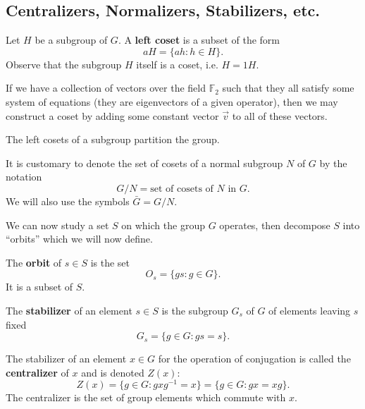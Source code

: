 \subsection{Centralizers, Normalizers, Stabilizers, etc.}

\begin{defn}
Let $H$ be a subgroup of $G$. A \textbf{left coset} is a subset of the form
\begin{equation}
aH = \{ ah : h\in H \}.
\end{equation}
Observe that the subgroup $H$ itself is a coset, i.e. $H=1H$.
\end{defn}

\begin{ex}
If we have a collection of vectors over the field $\mathbb{F}_2$ such that they
all satisfy some system of equations (they are eigenvectors of a given operator),
then we may construct a coset by adding some constant vector $\vec{v}$ to all
of these vectors.
\end{ex}

\begin{cor}
The left cosets of a subgroup partition the group.
\end{cor}



It is customary to denote the set of cosets of a normal subgroup $N$ of $G$ by
the notation
\begin{equation}
G/N = \textrm{set of cosets of }N\textrm{ in }G.
\end{equation}
We will also use the symbols $\bar{G} = G/N$.

We can now study a set $S$ on which the group $G$ operates, then decompose
$S$ into ``orbits'' which we will now define.

\begin{defn}
The \textbf{orbit} of $s\in S$ is the set
\begin{equation}
O_{s} = \{ gs : g\in G\}.
\end{equation}
It is a subset of $S$.
\end{defn}

\begin{defn}
The \textbf{stabilizer} of an element $s\in S$ is the subgroup $G_{s}$ of $G$ of
elements leaving $s$ fixed
\begin{equation}
G_{s} = \{ g\in G : gs = s \}.
\end{equation}
\end{defn}





\begin{defn}
The stabilizer of an element $x\in G$ for the operation of conjugation is called
the \textbf{centralizer} of $x$ and is denoted $Z(x)$:
\begin{equation}
Z(x) = \{ g\in G: gxg^{-1} = x\} = \{ g\in G: gx = xg\}.
\end{equation}
The centralizer is the set of group elements which commute with $x$.
\end{defn}
